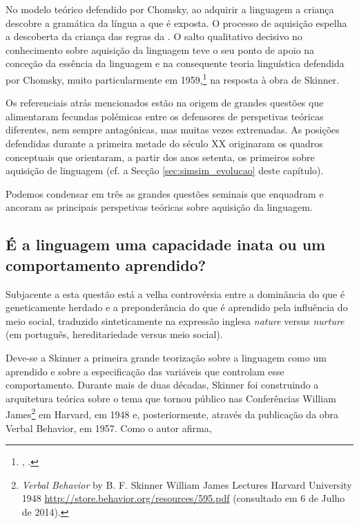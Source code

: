 \documentclass[output=paper]{LSP/langsci}
\begin{document}
No modelo teórico defendido por Chomsky, ao adquirir a linguagem a criança descobre a gramática da língua a que é exposta. O processo de aquisição espelha a descoberta da criança das regras da . O salto qualitativo decisivo no conhecimento sobre aquisição da linguagem teve o seu ponto de apoio na conceção da essência da linguagem e na consequente teoria linguística defendida por Chomsky, muito particularmente em 1959,\footnote{, \citeyear{chomsky1959}.} na resposta à obra  \citeyearpar{skinner57} de Skinner. 

Os referenciais atrás mencionados estão na origem de grandes questões que alimentaram fecundas polémicas entre os defensores de perspetivas teóricas diferentes, nem sempre antagónicas, mas muitas vezes extremadas. As posições defendidas durante a primeira metade do século XX originaram os quadros conceptuais que orientaram, a partir dos anos setenta, os primeiros  sobre aquisição de linguagem (cf. a Secção \ref{sec:simsim_evolucao} deste capítulo). 

Podemos condensar em três as grandes questões seminais que enquadram e ancoram as principais perspetivas teóricas sobre aquisição da linguagem.

\subsection{É a linguagem uma capacidade inata ou um comportamento aprendido?}
\label{subsec:simsim_inata_aprendido}
Subjacente a esta questão está a velha controvérsia entre a dominância do que é geneticamente herdado e a preponderância do que é aprendido pela influência do meio social, traduzido sinteticamente na expressão inglesa \emph{nature} versus \emph{nurture} (em português, hereditariedade versus meio social).

Deve-se a Skinner a primeira grande teorização sobre a linguagem como um  aprendido e sobre a especificação das variáveis que controlam esse comportamento. Durante mais de duas décadas, Skinner foi construindo a arquitetura teórica sobre o tema que tornou público nas Conferências William James\footnote{\textit{Verbal Behavior} by B. F. Skinner William James Lectures Harvard University 1948 \url{http://store.behavior.org/resources/595.pdf} (consultado em 6 de Julho de 2014).} em Harvard, em 1948 e, posteriormente, através da publicação da obra Verbal Behavior, em 1957. Como o autor afirma,\largerpage
\end{document}

